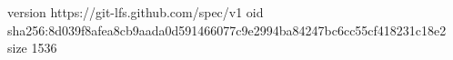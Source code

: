 version https://git-lfs.github.com/spec/v1
oid sha256:8d039f8afea8cb9aada0d591466077c9e2994ba84247bc6cc55cf418231c18e2
size 1536
